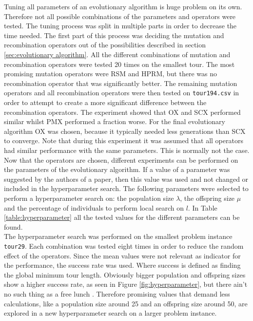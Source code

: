 \documentclass[a4paper,10pt]{article}
\begin{document}
Tuning all parameters of an evolutionary algorithm is huge problem on its own. Therefore not all possible combinations of the parameters and operators were tested. The tuning process was split in multiple parts in order to decrease the time needed. The first part of this process was deciding the mutation and recombination operators out of the possibilities described in section \ref{sec:evolutionary algorithm}. All the different combinations of mutation and recombination operators were tested 20 times on the smallest tour. The most promising mutation operators were RSM and HPRM, but there was no recombination operator that was significantly better. The remaining mutation operators and all recombination operators were then tested on \texttt{tour194.csv} in order to attempt to create a more significant difference between the recombination operators. The experiment showed that OX and SCX performed similar whilst PMX performed a fraction worse. For the final evolutionary algorithm OX was chosen, because it typically needed less generations than SCX to converge. Note that during this experiment it was assumed that all operators had similar performance with the same parameters. This is normally not the case.\\

Now that the operators are chosen, different experiments can be performed on the parameters of the evolutionary algorithm. If a value of a parameter was suggested by the authors of a paper, then this value was used and not changed or included in the hyperparameter search. The following parameters were selected to perform a hyperparameter search on: the population size $\lambda$, the offspring size $\mu$ and the percentage of individuals to perform local search on $l$. In Table \ref{table:hyperparameter} all the tested values for the different parameters can be found.\\
The hyperparameter search was performed on the smallest problem instance \texttt{tour29}. Each combination was tested eight times in order to reduce the random effect of the operators. Since the mean values were not relevant as indicator for the performance, the success rate was used. Where success is defined as finding the global minimum tour length. Obviously bigger population and offspring sizes show a higher success rate, as seen in Figure \ref{fig:hyperparameter}, but there ain't no such thing as a free lunch \cite{freelunch}. Therefore promising values that demand less calculations, like a population size around 25 and an offspring size around 50, are explored in a new hyperparameter search on a larger problem instance.\\
\end{document}

